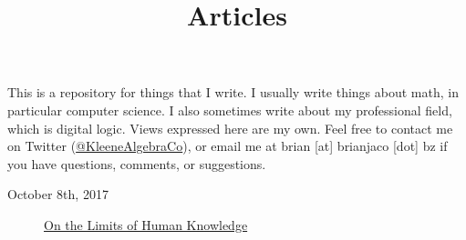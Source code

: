 \documentclass{article}
\title{Articles}
\date{}
\begin{document}
\maketitle

This is a repository for things that I write. I usually write things about math, in particular computer science. I also sometimes write about my professional field, which is digital logic. Views expressed here are my own. Feel free to contact me on Twitter (\href{https://twitter.com/KleeneAlgebraCo}{@KleeneAlgebraCo}), or email me at brian [at] brianjaco [dot] bz if you have questions, comments, or suggestions.

\begin{description}
\item[October 8th, 2017] \href{limits-of-human-knowledge/index.html}{On the Limits of Human Knowledge}
\end{description}
\end{document}
